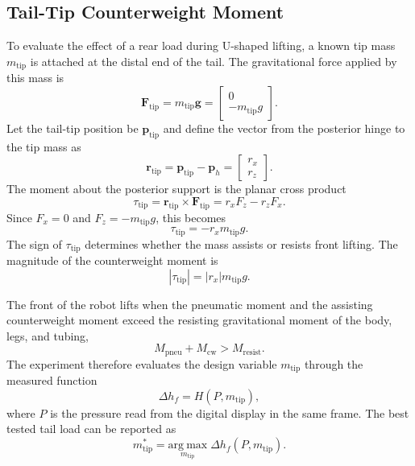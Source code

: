 \subsection{Tail-Tip Counterweight Moment}

To evaluate the effect of a rear load during U-shaped lifting, a known tip mass $m_{\mathrm{tip}}$ is attached at the distal end of the tail. The gravitational force applied by this mass is
\begin{equation}
  \mathbf{F}_{\mathrm{tip}} =
  m_{\mathrm{tip}}\mathbf{g}
  =
  \begin{bmatrix}
    0 \\
    -m_{\mathrm{tip}}g
  \end{bmatrix}.
  \label{eqn:tip_weight_force}
\end{equation}
Let the tail-tip position be $\mathbf{p}_{\mathrm{tip}}$ and define the vector from the posterior hinge to the tip mass as
\begin{equation}
  \mathbf{r}_{\mathrm{tip}} =
  \mathbf{p}_{\mathrm{tip}}-\mathbf{p}_h
  =
  \begin{bmatrix}
    r_x \\
    r_z
  \end{bmatrix}.
  \label{eqn:tip_moment_arm}
\end{equation}
The moment about the posterior support is the planar cross product
\begin{equation}
  \tau_{\mathrm{tip}} =
  \mathbf{r}_{\mathrm{tip}} \times \mathbf{F}_{\mathrm{tip}}
  = r_xF_z-r_zF_x .
  \label{eqn:tip_moment_cross_product}
\end{equation}
Since $F_x=0$ and $F_z=-m_{\mathrm{tip}}g$, this becomes
\begin{equation}
  \tau_{\mathrm{tip}} = -r_xm_{\mathrm{tip}}g .
  \label{eqn:tip_moment_scalar}
\end{equation}
The sign of $\tau_{\mathrm{tip}}$ determines whether the mass assists or resists front lifting. The magnitude of the counterweight moment is
\begin{equation}
  |\tau_{\mathrm{tip}}| = |r_x|m_{\mathrm{tip}}g .
  \label{eqn:tip_moment_magnitude}
\end{equation}

The front of the robot lifts when the pneumatic moment and the assisting counterweight moment exceed the resisting gravitational moment of the body, legs, and tubing,
\begin{equation}
  M_{\mathrm{pneu}} + M_{\mathrm{cw}} > M_{\mathrm{resist}}.
  \label{eqn:front_lifting_condition}
\end{equation}
The experiment therefore evaluates the design variable $m_{\mathrm{tip}}$ through the measured function
\begin{equation}
  \Delta h_f = H(P,m_{\mathrm{tip}}),
  \label{eqn:front_height_function}
\end{equation}
where $P$ is the pressure read from the digital display in the same frame. The best tested tail load can be reported as
\begin{equation}
  m_{\mathrm{tip}}^{*} =
  \underset{m_{\mathrm{tip}}}{\mathrm{arg\ max}}\; \Delta h_f(P,m_{\mathrm{tip}}).
  \label{eqn:best_tip_mass}
\end{equation}

